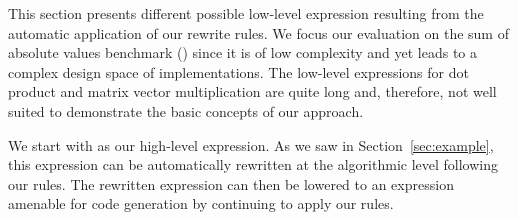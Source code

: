 

This section presents different possible low-level expression resulting from the automatic application of our rewrite rules.
We focus our evaluation on the sum of absolute values benchmark () since it is of low complexity and yet leads to a complex design space of implementations.
The low-level expressions for dot product and matrix vector multiplication are quite long and, therefore, not well suited to demonstrate the basic concepts of our approach.

We start with  as our high-level expression.
As we saw in Section~\ref{sec:example}, this expression can be automatically rewritten at the algorithmic level following our rules.
The rewritten expression can then be lowered to an expression amenable for code generation by continuing to apply our rules.

